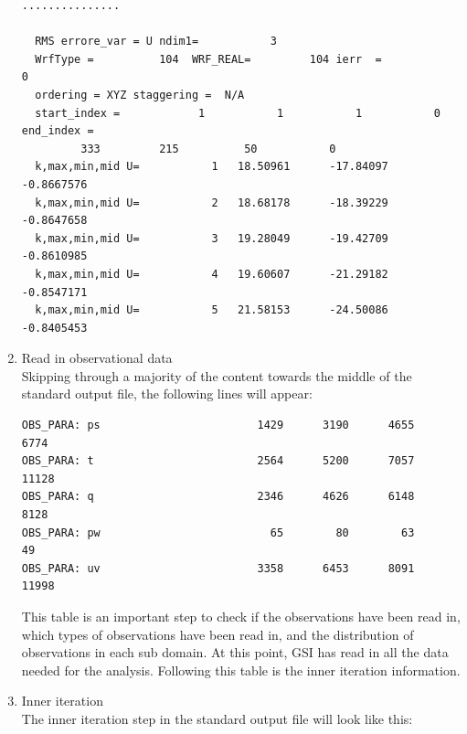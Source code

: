 \begin{enumerate}
\begin{scriptsize}
\begin{verbatim}
...............

  RMS errore_var = U ndim1=           3
  WrfType =          104  WRF_REAL=         104 ierr  =            0
  ordering = XYZ staggering =  N/A
  start_index =            1           1           1           0  end_index =
         333         215          50           0
  k,max,min,mid U=           1   18.50961      -17.84097     -0.8667576
  k,max,min,mid U=           2   18.68178      -18.39229     -0.8647658
  k,max,min,mid U=           3   19.28049      -19.42709     -0.8610985
  k,max,min,mid U=           4   19.60607      -21.29182     -0.8547171
  k,max,min,mid U=           5   21.58153      -24.50086     -0.8405453
\end{verbatim}
\end{scriptsize}

\item Read in observational data\\

Skipping through a majority of the content towards the middle of the standard output file, the following lines will appear:

\begin{scriptsize}
\begin{verbatim}
OBS_PARA: ps                        1429      3190      4655      6774
OBS_PARA: t                         2564      5200      7057     11128
OBS_PARA: q                         2346      4626      6148      8128
OBS_PARA: pw                          65        80        63        49
OBS_PARA: uv                        3358      6453      8091     11998
\end{verbatim}
\end{scriptsize}

This table is an important step to check if the observations have been read in, which types of observations have been read in, and the distribution of observations in each sub domain.  At this point, GSI has read in all the data needed for the analysis.  Following this table is the inner iteration information.\\ 

\item Inner iteration\\

The inner iteration step in the standard output file will look like this:


\end{enumerate}
